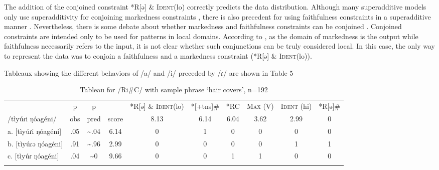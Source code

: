 \documentclass[output=paper,newtxmath,modfonts,nonflat,draftmode]{langsci/langscibook}
\begin{document}
The addition of the conjoined constraint *R[ə] \& \textsc{Ident}(lo) correctly predicts the data distribution. Although many superadditive models only use superadditivity for conjoining markedness constraints \citep{AlbrightEtAl2008}, there is also precedent for using faithfulness constraints in a superadditive manner \citep{GreenDavis2014}. Nevertheless, there is some debate about whether markedness and faithfulness constraints can be conjoined \citep{MoretonSmolensky2002}. Conjoined constraints are intended only to be used for patterns in local domains. According to \citet{MoretonSmolensky2002}, as the domain of markedness is the output while faithfulness necessarily refers to the input, it is not clear whether such conjunctions can be truly considered local. In this case, the only way to represent the data was to conjoin a faithfulness and a markedness constraint (*R[ə] \& \textsc{Ident}(lo)). 

Tableaux showing the different behaviors of /a/ and /i/ preceded by /ɾ/ are shown in Table 5 

\begin{table}
\caption{Tableau for /Ri\#C/ with sample phrase ‘hair covers’, n=192}
\label{tab:baird:5}
\begin{tabularx}{\textwidth}{Xccccccccc} 
\lsptoprule

{} &  p   &  p   &    &   *R[ə] \& \textsc{Ident}(lo)  &   *[+tns]\#   &    *RC   &   \textsc{Max} (V)   &   \textsc{Ident} (hi)   &   *R[ə]\#  \\

   /tìyúɾi ŋóagéni/ & obs & pred & score & 8.13 & 6.14 & 6.04 & 3.62 & 2.99 & 0 \\
{a. [tìyúɾi ŋóagéni]} & .05 & \textasciitilde .04 & 6.14 & 0 &1 & 0 & 0 & 0 & 0 \\
{b. [tìyúɾə ŋóagéni]} & .91 & \textasciitilde .96 & 2.99 & 0 & 0&0 & 0 & 1 & 1 \\
{c. [tìyúɾ ŋóagéni]} & .04 & \textasciitilde 0 & 9.66 & 0 &0& 1 & 1 & 0 & 0\\
\lspbottomrule\end{tabularx}
\end{table}
\end{document}
